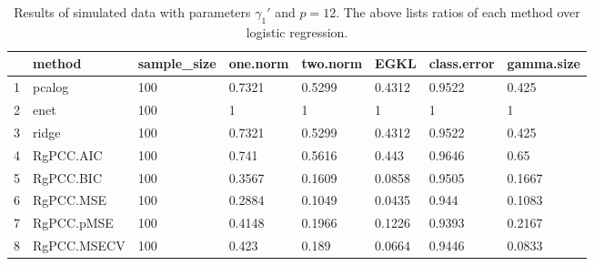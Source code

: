 \begin{table}[ht]
\centering
\begin{tabular}{rlllllll}
  \hline
 & method & sample\_size & one.norm & two.norm & EGKL & class.error & gamma.size \\ 
  \hline
1 & pcalog & 100 & 0.7321 & 0.5299 & 0.4312 & 0.9522 & 0.425 \\ 
  2 & enet & 100 & 1 & 1 & 1 & 1 & 1 \\ 
  3 & ridge & 100 & 0.7321 & 0.5299 & 0.4312 & 0.9522 & 0.425 \\ 
  4 & RgPCC.AIC & 100 & 0.741 & 0.5616 & 0.443 & 0.9646 & 0.65 \\ 
  5 & RgPCC.BIC & 100 & 0.3567 & 0.1609 & 0.0858 & 0.9505 & 0.1667 \\ 
  6 & RgPCC.MSE & 100 & 0.2884 & 0.1049 & 0.0435 & 0.944 & 0.1083 \\ 
  7 & RgPCC.pMSE & 100 & 0.4148 & 0.1966 & 0.1226 & 0.9393 & 0.2167 \\ 
  8 & RgPCC.MSECV & 100 & 0.423 & 0.189 & 0.0664 & 0.9446 & 0.0833 \\ 
   \hline
\end{tabular}
\caption{Results of simulated data with parameters $\gamma_1'$ and $p =12$. The above lists ratios of each method over logistic regression.} 
\label{fig-1'-nonlead-alt-new-algo-12-metrics-pratio}
\end{table}
